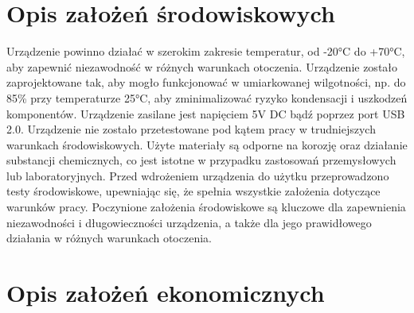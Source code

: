     \section{Opis założeń środowiskowych}
    
Urządzenie powinno działać w szerokim zakresie temperatur, od -20°C do +70°C, aby zapewnić niezawodność w różnych warunkach otoczenia. Urządzenie zostało zaprojektowane tak, aby mogło funkcjonować w umiarkowanej wilgotności, np. do 85\% przy temperaturze 25°C, aby zminimalizować ryzyko kondensacji i uszkodzeń komponentów. Urządzenie zasilane jest napięciem 5V DC bądź poprzez port USB 2.0. Urządzenie nie zostało przetestowane pod kątem pracy w trudniejszych warunkach środowiskowych. Użyte materiały są odporne na korozję oraz działanie substancji chemicznych, co jest istotne w przypadku zastosowań przemysłowych lub laboratoryjnych. Przed wdrożeniem urządzenia do użytku przeprowadzono testy środowiskowe, upewniając się, że spełnia wszystkie założenia dotyczące warunków pracy.
Poczynione założenia środowiskowe są kluczowe dla zapewnienia niezawodności i długowieczności urządzenia, a także dla jego prawidłowego działania w różnych warunkach otoczenia.


    \section{Opis założeń ekonomicznych}